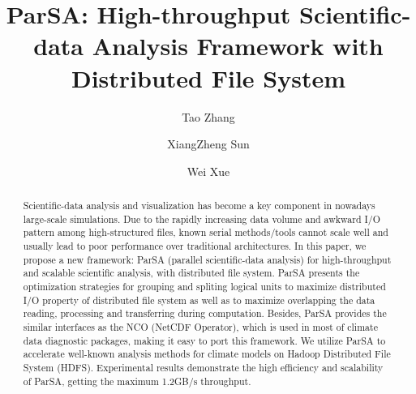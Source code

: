 \documentclass[preprint,12pt]{elsarticle}
\begin{document}
\begin{frontmatter}



\title{ParSA: High-throughput Scientific-data Analysis Framework with Distributed File System}



\author[1]{Tao Zhang}
\author[2]{XiangZheng Sun}
\author[1]{Wei Xue}
\address[1]{Department of Computer Science and Technology, Tsinghua University, Beijing, China}
\address[2]{Intel Corporation, Beijing, China}

\begin{abstract}
Scientific-data analysis and visualization has become a key component in nowadays large-scale simulations. Due to the rapidly
increasing data volume and awkward I/O pattern among high-structured files, known serial methods/tools cannot scale well and 
usually lead to poor performance over traditional architectures. In this paper, we propose a new framework: ParSA 
(parallel scientific-data analysis) for high-throughput and scalable scientific analysis, with distributed file system. ParSA
presents the optimization strategies for grouping and spliting logical units to maximize distributed I/O property of distributed 
file system as well as to maximize overlapping the data reading, processing and transferring during computation. Besides, ParSA 
provides the similar interfaces as the NCO (NetCDF Operator), which is used in most of climate data diagnostic packages, making
it easy to port this framework. We utilize ParSA to accelerate well-known analysis methods for climate models on Hadoop Distributed File 
System (HDFS). Experimental results demonstrate the high efficiency and scalability of ParSA, getting the maximum 1.2GB/s throughput.
\end{abstract}


\end{frontmatter}
\end{document}
